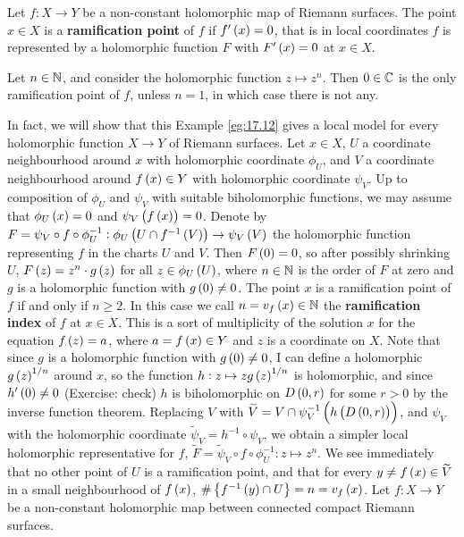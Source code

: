 \begin{definition}
Let $ f : X \to Y $ be a non-constant holomorphic map of Riemann surfaces. The point $ x \in X $ is a \textbf{ramification point} of $ f $ if $ f'\br{x} = 0 $, that is in local coordinates $ f $ is represented by a holomorphic function $ F $ with $ F'\br{x} = 0 $ at $ x \in X $.
\end{definition}

\pagebreak

\begin{example}
\label{eg:17.12}
Let $ n \in \mathbb{N} $, and consider the holomorphic function $ z \mapsto z^n $. Then $ 0 \in \mathbb{C} $ is the only ramification point of $ f $, unless $ n = 1 $, in which case there is not any.
\end{example}

In fact, we will show that this Example \ref{eg:17.12} gives a local model for every holomorphic function $ X \to Y $ of Riemann surfaces. Let $ x \in X $, $ U $ a coordinate neighbourhood around $ x $ with holomorphic coordinate $ \phi_U $, and $ V $ a coordinate neighbourhood around $ f\br{x} \in Y $ with holomorphic coordinate $ \psi_V $. Up to composition of $ \phi_U $ and $ \psi_V $ with suitable biholomorphic functions, we may assume that $ \phi_U\br{x} = 0 $ and $ \psi_V\br{f\br{x}} = 0 $. Denote by $ F = \psi_V \circ f \circ \phi_U^{-1} : \phi_U\br{U \cap f^{-1}\br{V}} \to \psi_V\br{V} $ the holomorphic function representing $ f $ in the charts $ U $ and $ V $. Then $ F\br{0} = 0 $, so after possibly shrinking $ U $, $ F\br{z} = z^n \cdot g\br{z} $ for all $ z \in \phi_U\br{U} $, where $ n \in \mathbb{N} $ is the order of $ F $ at zero and $ g $ is a holomorphic function with $ g\br{0} \ne 0 $. The point $ x $ is a ramification point of $ f $ if and only if $ n \ge 2 $. In this case we call $ n = v_f\br{x} \in \N $ the \textbf{ramification index} of $ f $ at $ x \in X $. This is a sort of multiplicity of the solution $ x $ for the equation $ f\br{z} = a $, where $ a = f\br{x} \in Y $ and $ z $ is a coordinate on $ X $. Note that since $ g $ is a holomorphic function with $ g\br{0} \ne 0 $, I can define a holomorphic $ g\br{z}^{1 / n} $ around $ x $, so the function $ h : z \mapsto zg\br{z}^{1 / n} $ is holomorphic, and since $ h'\br{0} \ne 0 $ (Exercise: check) $ h $ is biholomorphic on $ D\br{0, r} $ for some $ r > 0 $ by the inverse function theorem. Replacing $ V $ with $ \widetilde{V} = V \cap \psi_V^{-1}\br{h\br{D\br{0, r}}} $, and $ \psi_V $ with the holomorphic coordinate $ \widetilde{\psi}_V = h^{-1} \circ \psi_V $, we obtain a simpler local holomorphic representative for $ f $, $ \widetilde{F} = \widetilde{\psi}_V \circ f \circ \phi_U^{-1} : z \mapsto z^n $. We see immediately that no other point of $ U $ is a ramification point, and that for every $ y \ne f\br{x} \in \widetilde{V} $ in a small neighbourhood of $ f\br{x} $, $ \#\cbr{f^{-1}\br{y} \cap U} = n = v_f\br{x} $. Let $ f : X \to Y $ be a non-constant holomorphic map between connected compact Riemann surfaces.

